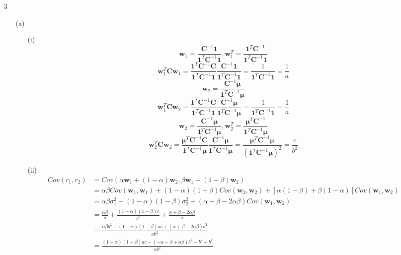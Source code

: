 \documentclass{article}
\begin{document}
\begin{enumerate}
\item[3]
\begin{itemize}
\item[(a)]
\begin{itemize}
\item[(i)]
\[\mathbf{w}_1=\frac{\mathbf{C}^{-1}\mathbf{1}}{\mathbf{1}^T\mathbf{C}^{-1}\mathbf{1}}, \mathbf{w}_1^T=\frac{\mathbf{1}^T\mathbf{C}^{-1}}{\mathbf{1}^T\mathbf{C}^{-1}\mathbf{1}}\]
\[\mathbf{w}_1^T\mathbf{C}\mathbf{w}_1=\frac{\mathbf{1}^T\mathbf{C}^{-1}\mathbf{C}}{\mathbf{1}^T\mathbf{C}^{-1}\mathbf{1}}\frac{\mathbf{C}^{-1}\mathbf{1}}{\mathbf{1}^T\mathbf{C}^{-1}\mathbf{1}}=\frac{1}{\mathbf{1}^T\mathbf{C}^{-1}\mathbf{1}}=\frac{1}{a}\]
\[\mathbf{w}_2=\frac{\mathbf{C}^{-1}\boldsymbol\mu}{\mathbf{1}^T\mathbf{C}^{-1}\boldsymbol\mu}\]
\[\mathbf{w}_1^T\mathbf{C}\mathbf{w}_2=\frac{\mathbf{1}^T\mathbf{C}^{-1}\mathbf{C}}{\mathbf{1}^T\mathbf{C}^{-1}\mathbf{1}}\frac{\mathbf{C}^{-1}\boldsymbol\mu}{\mathbf{1}^T\mathbf{C}^{-1}\boldsymbol\mu}=\frac{1}{\mathbf{1}^T\mathbf{C}^{-1}\mathbf{1}}=\frac{1}{a}\]
\[\mathbf{w}_2=\frac{\mathbf{C}^{-1}\boldsymbol\mu}{\mathbf{1}^T\mathbf{C}^{-1}\boldsymbol\mu}, \mathbf{w}_2^T=\frac{\boldsymbol\mu^T\mathbf{C}^{-1}}{\mathbf{1}^T\mathbf{C}^{-1}\boldsymbol\mu}\]
\[\mathbf{w}_2^T\mathbf{C}\mathbf{w}_2=\frac{\boldsymbol\mu^T\mathbf{C}^{-1}\mathbf{C}}{\mathbf{1}^T\mathbf{C}^{-1}\boldsymbol\mu}\frac{\mathbf{C}^{-1}\boldsymbol\mu}{\mathbf{1}^T\mathbf{C}^{-1}\boldsymbol\mu}=\frac{\boldsymbol\mu^T\mathbf{C}^{-1}\boldsymbol\mu}{(\mathbf{1}^T\mathbf{C}^{-1}\boldsymbol\mu)^2}=\frac{c}{b^2}\]
\item[(ii)]
\begin{align*}
Cov(r_1,r_2)&=Cov(\alpha \mathbf{w}_1+(1-\alpha)\mathbf{w}_2,\beta \mathbf{w}_1+(1-\beta)\mathbf{w}_2) \\
&=\alpha \beta Cov(\mathbf{w}_1,\mathbf{w}_1)+(1-\alpha)(1-\beta)Cov(\mathbf{w}_2,\mathbf{w}_2)+[\alpha(1-\beta)+\beta(1-\alpha)]Cov(\mathbf{w}_1,\mathbf{w}_2) \\
&=\alpha \beta \sigma_1^2+(1-\alpha)(1-\beta)\sigma_2^2+(\alpha+\beta-2\alpha \beta)Cov(\mathbf{w}_1,\mathbf{w}_2) \\
&=\frac{\alpha \beta}{a}+\frac{(1-\alpha)(1-\beta)c}{b^2}+\frac{\alpha+\beta-2\alpha \beta}{a} \\
&=\frac{\alpha \beta b^2+(1-\alpha)(1-\beta)ac+(\alpha + \beta-2\alpha \beta)b^2}{ab^2} \\
&=\frac{(1-\alpha)(1-\beta)ac-(-\alpha-\beta+\alpha \beta) b^2-b^2+b^2}{ab^2} \\

\end{align*}
\end{itemize}
\end{itemize}
\end{enumerate}
\end{document}
